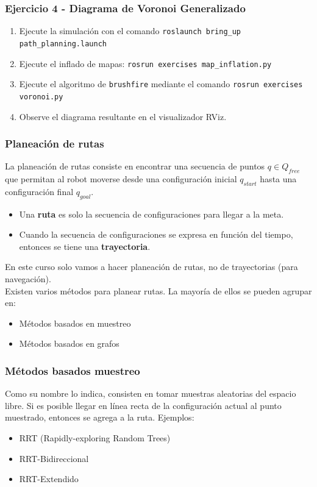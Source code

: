 \begin{frame}[containsverbatim]\frametitle{Ejercicio 4 - Diagrama de Voronoi Generalizado}
  \begin{enumerate}
  \item Ejecute la simulación con el comando \texttt{roslaunch bring\_up path\_planning.launch}
  \item Ejecute el inflado de mapas: \texttt{rosrun exercises map\_inflation.py}
  \item Ejecute el algoritmo de \texttt{brushfire} mediante el comando \texttt{rosrun exercises voronoi.py}
  \item Observe el diagrama resultante en el visualizador RViz.
  \end{enumerate}
\end{frame}

\begin{frame}\frametitle{Planeación de rutas}
  La planeación de rutas consiste en encontrar una secuencia de puntos $q\in Q_{free}$ que permitan al robot moverse desde una configuración inicial $q_{start}$ hasta una configuración final $q_{goal}$.
  \begin{itemize}
  \item Una \textbf{ruta} es solo la secuencia de configuraciones para llegar a la meta.
  \item Cuando la secuencia de configuraciones se expresa en función del tiempo, entonces se tiene una \textbf{trayectoria}. 
  \end{itemize}
  En este curso solo vamos a hacer planeación de rutas, no de trayectorias (para navegación).\\
  Existen varios métodos para planear rutas. La mayoría de ellos se pueden agrupar en:
  \begin{itemize}
  \item Métodos basados en muestreo
  \item Métodos basados en grafos
  \end{itemize}
\end{frame}

\begin{frame}\frametitle{Métodos basados muestreo}
  Como su nombre lo indica, consisten en tomar muestras aleatorias del espacio libre. Si es posible llegar en línea recta de la configuración actual al punto muestrado, entonces se agrega a la ruta.
  Ejemplos:
  \begin{itemize}
  \item RRT (Rapidly-exploring Random Trees)
  \item RRT-Bidireccional
  \item RRT-Extendido
  \end{itemize}
\end{frame}

